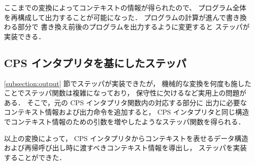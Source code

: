ここまでの変換によってコンテキストの情報が得られたので、
プログラム全体を再構成して出力することが可能になった．
プログラムの計算が進んで書き換わる部分で
書き換え前後のプログラムを出力するように変更すると
ステッパが実装できる．

\subsection{CPS インタプリタを基にしたステッパ}
\label{subsection:stepper}

\ref{subsection:output} 節でステッパが実装できたが，
機械的な変換を何度も施したことでステッパ関数は複雑になっており，
保守性に欠けるなど実用上の問題がある．
そこで，元の CPS インタプリタ関数内の対応する部分に
出力に必要なコンテキスト情報および出力命令を追加すると，
CPS インタプリタと同じ構造でコンテキスト情報のための引数を増やしたようなステッパ関数を得られる．

以上の変換によって，
CPS インタプリタからコンテキストを表せるデータ構造および再帰呼び出し時に渡すべきコンテキスト情報を導出し，
ステッパを実装することができた．
